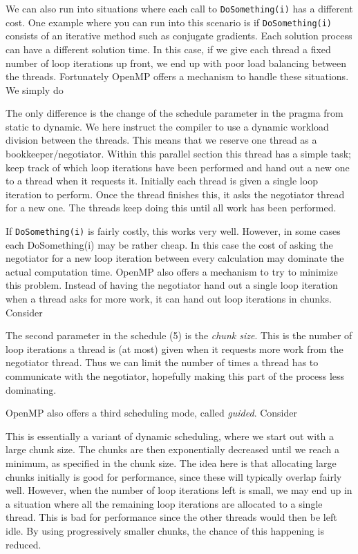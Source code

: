 We can also run into situations where each call to \texttt{DoSomething(i)} has a
different cost. One example where you can run into this scenario is if
\texttt{DoSomething(i)} consists of an iterative method such as conjugate
gradients. Each solution process can have a different solution time. In this
case, if we give each thread a fixed number of loop iterations up front, we end
up with poor load balancing between the threads. Fortunately OpenMP offers a
mechanism to handle these situations. We simply do

The only difference is the change of the schedule parameter in the pragma from
static to dynamic. We here instruct the compiler to use a dynamic workload
division between the threads. This means that we reserve one thread as a
bookkeeper/negotiator. Within this parallel section this thread has a simple
task; keep track of which loop iterations have been performed and hand out a new
one to a thread when it requests it. Initially each thread is given a single
loop iteration to perform. Once the thread finishes this, it asks the negotiator
thread for a new one. The threads keep doing this until all work has been
performed.

If \texttt{DoSomething(i)} is fairly costly, this works very well. However, in
some cases each DoSomething(i) may be rather cheap. In this case the cost of
asking the negotiator for a new loop iteration between every calculation may
dominate the actual computation time. OpenMP also offers a mechanism to try to
minimize this problem. Instead of having the negotiator hand out a single loop
iteration when a thread asks for more work, it can hand out loop iterations in
chunks. Consider

The second parameter in the schedule (5) is the \emph{chunk size}. This is the
number of loop iterations a thread is (at most) given when it requests more work
from the negotiator thread. Thus we can limit the number of times a thread has
to communicate with the negotiator, hopefully making this part of the process
less dominating.

OpenMP also offers a third scheduling mode, called \emph{guided}. Consider

This is essentially a variant of dynamic scheduling, where we start out with a
large chunk size. The chunks are then exponentially decreased until we reach a
minimum, as specified in the chunk size. The idea here is that allocating large
chunks initially is good for performance, since these will typically overlap
fairly well. However, when the number of loop iterations left is small, we may
end up in a situation where all the remaining loop iterations are allocated to a
single thread. This is bad for performance since the other threads would then be
left idle. By using progressively smaller chunks, the chance of this happening
is reduced.

